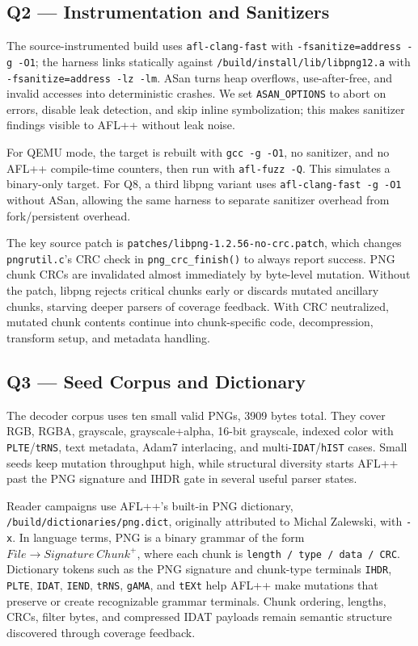 \documentclass[letterpaper,twocolumn,10pt]{article}
\begin{document}
\subsection{Q2 --- Instrumentation and Sanitizers}
The source-instrumented build uses \texttt{afl-clang-fast} with
\texttt{-fsanitize=address -g -O1}; the harness links statically against
\texttt{/build/install/lib/libpng12.a} with \texttt{-fsanitize=address -lz -lm}.
ASan turns heap overflows, use-after-free, and invalid accesses into
deterministic crashes. We set \texttt{ASAN\_OPTIONS} to abort on errors, disable
leak detection, and skip inline symbolization; this makes sanitizer findings
visible to AFL++ without leak noise.

For QEMU mode, the target is rebuilt with \texttt{gcc -g -O1}, no sanitizer, and
no AFL++ compile-time counters, then run with \texttt{afl-fuzz -Q}. This
simulates a binary-only target. For Q8, a third libpng variant uses
\texttt{afl-clang-fast -g -O1} without ASan, allowing the same harness to
separate sanitizer overhead from fork/persistent overhead.

The key source patch is \texttt{patches/libpng-1.2.56-no-crc.patch}, which
changes \texttt{pngrutil.c}'s CRC check in \texttt{png\_crc\_finish()} to always
report success. PNG chunk CRCs are invalidated almost immediately by byte-level
mutation. Without the patch, libpng rejects critical chunks early or discards
mutated ancillary chunks, starving deeper parsers of coverage feedback. With
CRC neutralized, mutated chunk contents continue into chunk-specific code,
decompression, transform setup, and metadata handling.

\subsection{Q3 --- Seed Corpus and Dictionary}
The decoder corpus uses ten small valid PNGs, 3909 bytes total. They cover RGB,
RGBA, grayscale, grayscale+alpha, 16-bit grayscale, indexed color with
\texttt{PLTE}/\texttt{tRNS}, text metadata, Adam7 interlacing, and
multi-\texttt{IDAT}/\texttt{hIST} cases. Small seeds keep mutation throughput
high, while structural diversity starts AFL++ past the PNG signature and IHDR
gate in several useful parser states.

Reader campaigns use AFL++'s built-in PNG dictionary,
\texttt{/build/dictionaries/png.dict}, originally attributed to Michal
Zalewski, with \texttt{-x}. In language terms, PNG is a binary
grammar of the form
\(\mathit{File} \to \mathit{Signature}\ \mathit{Chunk}^{+}\), where each chunk
is \texttt{length / type / data / CRC}. Dictionary tokens such as the PNG
signature and chunk-type terminals \texttt{IHDR}, \texttt{PLTE}, \texttt{IDAT},
\texttt{IEND}, \texttt{tRNS}, \texttt{gAMA}, and \texttt{tEXt} help AFL++ make
mutations that preserve or create recognizable grammar terminals. Chunk
ordering, lengths, CRCs, filter bytes, and compressed IDAT payloads remain
semantic structure discovered through coverage feedback.
\end{document}
